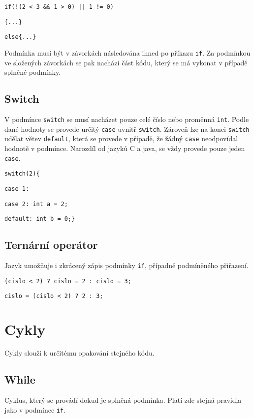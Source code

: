 \documentclass[czech]{thesiskiv}
\begin{document}

\texttt{if(!(2 < 3 \&\& 1 > 0) || 1 != 0)} 

\texttt{\{...\}}

\texttt{else\{...\} }

\noindent Podmínka musí být v závorkách následována ihned po příkazu \texttt{if}.
Za podmínkou ve složených závorkách se pak nachází část kódu, který se má vykonat v případě splněné podmínky.

\subsection{Switch}
V podmínce \texttt{switch} se musí nacházet pouze celé číslo nebo proměnná  \texttt{int}.
Podle dané hodnoty se provede určitý \texttt{case} uvnitř \texttt{switch}.
Zároveň lze na konci \texttt{switch} udělat větev \texttt{default}, která 
se provede v případě, že žádný \texttt{case} neodpovídal hodnotě v podmínce.
Narozdíl od jazyků C a java, se vždy provede pouze jeden \texttt{case}.


\texttt{switch(2)\{}

\texttt{case 1: }

\texttt{case 2: int a = 2;}

\texttt{default: int b = 0;\}}

\subsection{Ternární operátor}
Jazyk umožňuje i zkrácený zápis podmínky \texttt{if}, případně podmíněného přiřazení.


\texttt{(cislo < 2) ? cislo = 2 : cislo = 3;}


\texttt{cislo = (cislo < 2) ? 2 : 3;}

               
\section{Cykly}
Cykly slouží k určitému opakování stejného kódu.

\subsection{While}
Cyklus, který se provádí dokud je splněná podmínka.
Platí zde stejná pravidla jako v podmínce \texttt{if}.
\end{document}
